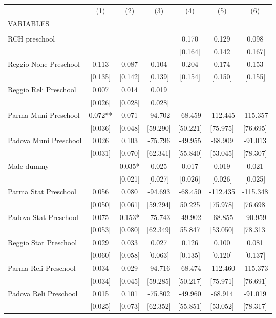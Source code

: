 \begin{tabular}{lcccccc} \hline
 & (1) & (2) & (3) & (4) & (5) & (6) \\
VARIABLES &  &  &  &  &  &  \\ \hline
 &  &  &  &  &  &  \\
RCH preschool &  &  &  & 0.170 & 0.129 & 0.098 \\
 &  &  &  & [0.164] & [0.142] & [0.167] \\
Reggio None Preschool & 0.113 & 0.087 & 0.104 & 0.204 & 0.174 & 0.153 \\
 & [0.135] & [0.142] & [0.139] & [0.154] & [0.150] & [0.155] \\
Reggio Reli Preschool & 0.007 & 0.014 & 0.019 &  &  &  \\
 & [0.026] & [0.028] & [0.028] &  &  &  \\
Parma Muni Preschool & 0.072** & 0.071 & -94.702 & -68.459 & -112.445 & -115.357 \\
 & [0.036] & [0.048] & [59.290] & [50.221] & [75.975] & [76.695] \\
Padova Muni Preschool & 0.026 & 0.103 & -75.796 & -49.955 & -68.909 & -91.013 \\
 & [0.031] & [0.070] & [62.341] & [55.840] & [53.045] & [78.307] \\
Male dummy &  & 0.035* & 0.025 & 0.017 & 0.019 & 0.021 \\
 &  & [0.021] & [0.027] & [0.026] & [0.026] & [0.025] \\
Parma Stat Preschool & 0.056 & 0.080 & -94.693 & -68.450 & -112.435 & -115.348 \\
 & [0.050] & [0.061] & [59.294] & [50.225] & [75.978] & [76.698] \\
Padova Stat Preschool & 0.075 & 0.153* & -75.743 & -49.902 & -68.855 & -90.959 \\
 & [0.053] & [0.080] & [62.349] & [55.847] & [53.050] & [78.313] \\
Reggio Stat Preschool & 0.029 & 0.033 & 0.027 & 0.126 & 0.100 & 0.081 \\
 & [0.060] & [0.058] & [0.063] & [0.135] & [0.120] & [0.137] \\
Parma Reli Preschool & 0.034 & 0.029 & -94.716 & -68.474 & -112.460 & -115.373 \\
 & [0.034] & [0.045] & [59.285] & [50.217] & [75.971] & [76.691] \\
Padova Reli Preschool & 0.015 & 0.101 & -75.802 & -49.960 & -68.914 & -91.019 \\
 & [0.025] & [0.073] & [62.352] & [55.851] & [53.052] & [78.317] \\

\end{tabular}

